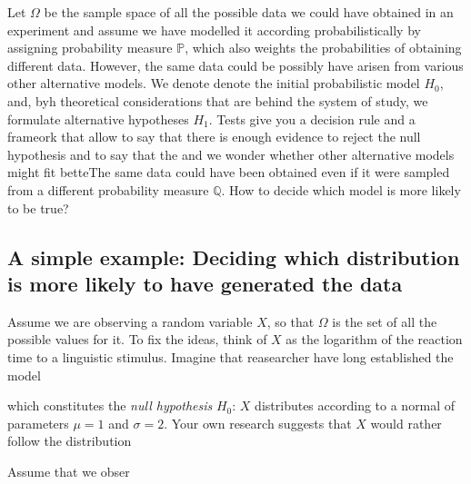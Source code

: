 	Let $\Omega$ be the sample space of all the possible data we could have obtained in an experiment and assume we have modelled it according probabilistically by assigning probability measure $\mathbb P$, which also weights the probabilities of obtaining different data. However, the same data could be possibly have arisen from various other alternative models. We denote denote the initial probabilistic model $H_0$, and, byh theoretical considerations that are behind the system of study, we formulate alternative hypotheses $H_1$. Tests give you a decision rule and a frameork that allow to say that there is enough evidence to reject the null hypothesis and to say that the   and we wonder whether other alternative models might fit betteThe same data could have been obtained even if it were sampled from a different probability measure $\mathbb Q$. How to decide which model is more likely to be true? 
	\subsection{ A simple example: Deciding which distribution is more likely to have generated the data }
	\label{}
	Assume we are observing a random variable $X$, so that $\Omega$ is the set of all the possible values for it. To fix the ideas, think of $X$ as the logarithm of the reaction time to a linguistic stimulus. Imagine that reasearcher have long established the model

which constitutes the \emph{null hypothesis} $H_0$: $X$ distributes according to a normal of parameters $\mu = 1$ and $\sigma = 2$.  Your own research suggests that $X$ would rather follow the distribution

Assume that we obser	
		\begin{example}[T]
			
		\end{example}

